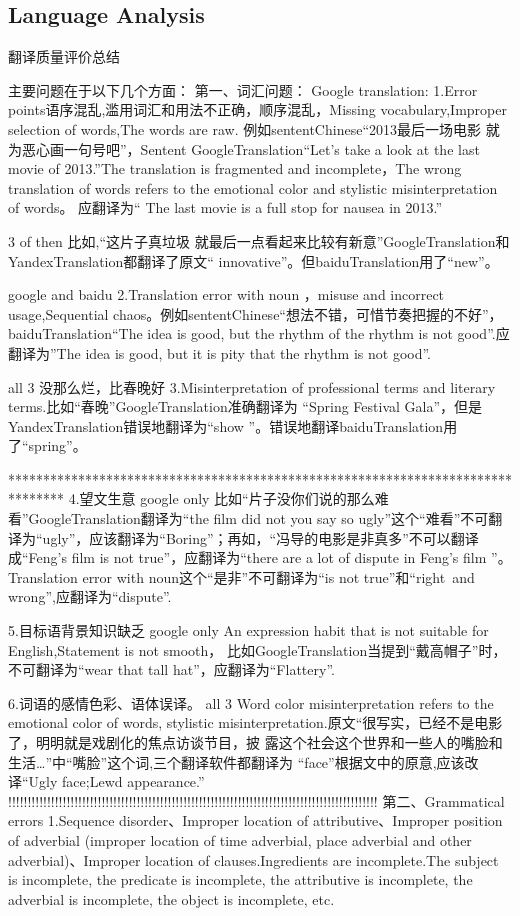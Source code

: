 \documentclass[conference]{IEEEtran}
\begin{document}
\begin{CJK*}{UTF8}{gbsn}
\subsection{Language Analysis}
翻译质量评价总结

主要问题在于以下几个方面：
第一、词汇问题：
Google translation:
1.Error points语序混乱,滥用词汇和用法不正确，顺序混乱，Missing vocabulary,Improper selection of words,The words are raw.
例如sententChinese“2013最后一场电影 就为恶心画一句号吧”，Sentent
GoogleTranslation“Let's take a look at the last movie of 2013.”The translation
is fragmented and incomplete，The wrong translation of words refers to the
emotional color and stylistic misinterpretation of words。 应翻译为“ The last
movie is a full stop for nausea in 2013.”

3 of then
比如,“这片子真垃圾 就最后一点看起来比较有新意”GoogleTranslation和YandexTranslation都翻译了原文“ innovative”。但baiduTranslation用了“new”。

google and baidu
2.Translation error with noun ，misuse and incorrect usage,Sequential chaos。例如sententChinese“想法不错，可惜节奏把握的不好”，baiduTranslation“The idea is good, but the rhythm of the rhythm is not good”.应翻译为”The idea is good, but it is pity that the rhythm is not good”.


all 3
没那么烂，比春晚好
3.Misinterpretation of professional terms and literary terms.比如“春晚”GoogleTranslation准确翻译为 “Spring Festival Gala”，但是YandexTranslation错误地翻译为“show ”。错误地翻译baiduTranslation用了“spring”。

********************************************************************************
4.望文生意
google only
比如“片子没你们说的那么难看”GoogleTranslation翻译为“the film did not you say so ugly”这个“难看”不可翻译为“ugly”，应该翻译为“Boring”；再如，“冯导的电影是非真多”不可以翻译成“Feng's film is not true”，应翻译为“there are a lot of dispute in Feng's film ”。Translation error with noun这个“是非”不可翻译为“is not true”和“right and wrong”,应翻译为“dispute”.

5.目标语背景知识缺乏
google only
An expression habit that is not suitable for English,Statement is not smooth，
比如GoogleTranslation当提到“戴高帽子”时，不可翻译为“wear that tall hat”，应翻译为“Flattery”.

6.词语的感情色彩、语体误译。
all 3
Word color misinterpretation refers to the emotional color of words, stylistic
misinterpretation.原文“很写实，已经不是电影了，明明就是戏剧化的焦点访谈节目，披
露这个社会这个世界和一些人的嘴脸和生活…”中“嘴脸”这个词,三个翻译软件都翻译为
“face”根据文中的原意,应该改译“Ugly face;Lewd appearance.”
!!!!!!!!!!!!!!!!!!!!!!!!!!!!!!!!!!!!!!!!!!!!!!!!!!!!!!!!!!!!!!!!!!!!!!!!!!!!!!!!!!!!!!!!!!!!!!!
第二、Grammatical errors
1.Sequence disorder、Improper location of attributive、Improper position of adverbial (improper location of time adverbial, place adverbial and other adverbial)、Improper location of clauses.Ingredients are incomplete.The subject is incomplete, the predicate is incomplete, the attributive is incomplete, the adverbial is incomplete, the object is incomplete, etc.


\end{CJK*}
\end{document}

